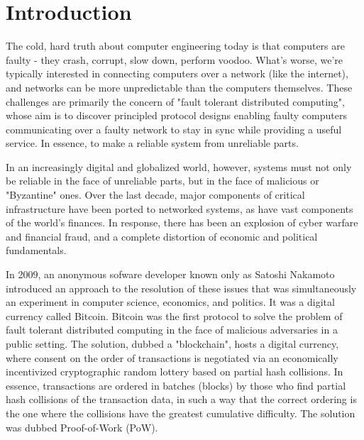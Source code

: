 \chapter{Introduction}
\label{ch:intro}

The cold, hard truth about computer engineering today is that computers are faulty - 
they crash, corrupt, slow down, perform voodoo. 
What's worse, we're typically interested in connecting computers over a network (like the internet),
and networks can be more unpredictable than the computers themselves.
These challenges are primarily the concern of "fault tolerant distributed computing",
whose aim is to discover principled protocol designs enabling faulty computers communicating over a faulty network 
to stay in sync while providing a useful service.
In essence, to make a reliable system from unreliable parts.

In an increasingly digital and globalized world, however, 
systems must not only be reliable in the face of unreliable parts, but in the face of malicious or "Byzantine" ones.
Over the last decade, major components of critical infrastructure have been ported to networked systems,
as have vast components of the world's finances.
In response, there has been an explosion of cyber warfare and financial fraud,
and a complete distortion of economic and political fundamentals.

In 2009, an anonymous sofware developer known only as Satoshi Nakamoto introduced an approach to the resolution of these issues 
that was simultaneously an experiment in computer science, economics, and politics. 
It was a digital currency called Bitcoin.
Bitcoin was the first protocol to solve the problem of fault tolerant distributed computing in the face of malicious adversaries in a public setting.
The solution, dubbed a "blockchain", hosts a digital currency, 
where consent on the order of transactions is negotiated via an economically incentivized cryptographic random lottery based on partial hash collisions.
In essence, transactions are ordered in batches (blocks) by those who find partial hash collisions of the transaction data, 
in such a way that the correct ordering is the one where the collisions have the greatest cumulative difficulty.
The solution was dubbed Proof-of-Work (PoW).

